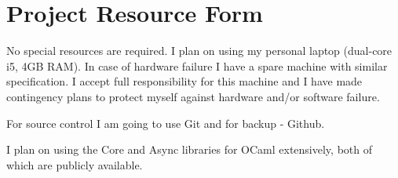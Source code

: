 \newpage

\section*{Project Resource Form}
No special resources are required. I plan on using my personal laptop (dual-core i5, 4GB RAM). In case of hardware failure I have a spare machine with similar specification. I accept full responsibility for this machine and I have made contingency plans to protect myself against hardware and/or software failure.

For source control I am going to use Git and for backup - Github.

I plan on using the Core and Async libraries for OCaml extensively, both of which are publicly available.




